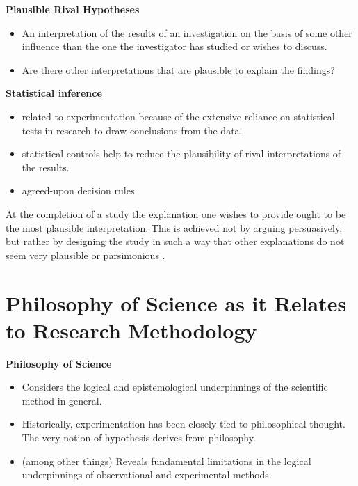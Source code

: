\documentclass[
  english,
]{book}
\providecommand{\tightlist}{%
  \setlength{\itemsep}{0pt}\setlength{\parskip}{0pt}}
\begin{document}
\textbf{Plausible Rival Hypotheses}

\begin{itemize}
\tightlist
\item
  An interpretation of the results of an investigation on the basis of some other influence than the one the investigator has studied or wishes to discuss.
\item
  Are there other interpretations that are plausible to explain the findings?
\end{itemize}

\textbf{Statistical inference}

\begin{itemize}
\tightlist
\item
  related to experimentation because of the extensive reliance on statistical tests in research to draw conclusions from the data.
\item
  statistical controls help to reduce the plausibility of rival interpretations of the results.
\item
  agreed-upon decision rules
\end{itemize}

At the completion of a study the explanation one wishes to provide ought to be the most plausible interpretation. This is achieved not by arguing persuasively, but rather by designing the study in such a way that other explanations do not seem very plausible or parsimonious \citep{kazdin_research_2017}.

\hypertarget{philosophy-of-science-as-it-relates-to-research-methodology}{%
\section{Philosophy of Science as it Relates to Research Methodology}\label{philosophy-of-science-as-it-relates-to-research-methodology}}

\textbf{Philosophy of Science}

\begin{itemize}
\tightlist
\item
  Considers the logical and epistemological underpinnings of the scientific method in general.
\item
  Historically, experimentation has been closely tied to philosophical thought. The very notion of hypothesis derives from philosophy.
\item
  (among other things) Reveals fundamental limitations in the logical underpinnings of observational and experimental methods.
\end{itemize}
\end{document}
